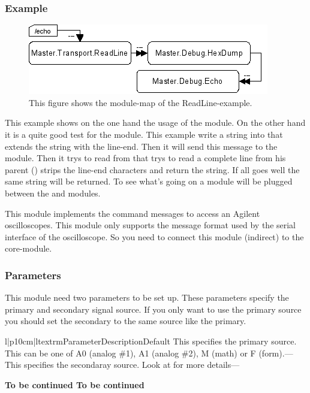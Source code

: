 \subsubsection{Example}
\begin{figure}[ht]
    \label{fig:coremod10}
    \centering
    \includegraphics{coremod10.png}
    \caption{This figure shows the module-map of the ReadLine-example.}
\end{figure}    
This example shows on the one hand the usage of the  module.
On the other hand it is a quite good test for the  module. 
This example write a string into  that extends the string 
with the line-end. Then it will send this message to the  module.
Then it trys to read from  that trys to read a complete 
line from his parent () strips the line-end characters and
return the string. If all goes well the same string will be returned. To see
what's going on a  module will be plugged between the 
 and  modules.




%
%
This module implements the command messages to access an Agilent 
oscilloscopes. This module only supports the message format used 
by the serial interface of the oscilloscope. So you need to connect
this module (indirect) to the 
core-module.

\subsubsection{Parameters}
This module need two parameters to be set up. These parameters specify the
primary and secondary signal source. If you only want to use the primary
source you should set the secondary to the same source like the primary.
\begin{tableiii}{l|p{10cm}|l}{textrm}{Parameter}{Description}{Default}
        {This specifies the primary source. This can be one of A0 (analog \#1),
         A1 (analog \#2), M (math) or F (form).}{---}
        {This specifies the secondaray source. Look at  for more
         details}{---}
\end{tableiii}         
\bf{To be continued} \bf{To be continued}

